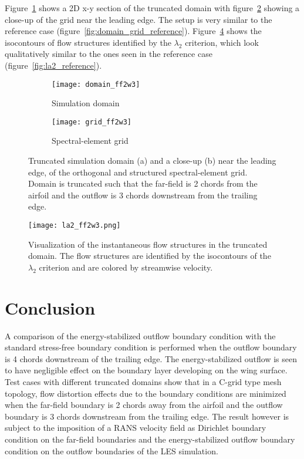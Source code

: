 Figure~\ref{fig:domain_ff2w3} shows a 2D x-y section of the truncated domain with figure~\ref{fig:grid_ff2w3} showing a close-up of the grid near the leading edge. The setup is very similar to the reference case (figure~\ref{fig:domain_grid_reference}). Figure~\ref{fig:la2_ff2w3} shows the isocontours of flow structures identified by the $\lambda_{2}$ criterion, which look qualitatively similar to the ones seen in the reference case (figure~\ref{fig:la2_reference}).
\begin{figure}[h]
	\centering
	\begin{subfigure}[b]{0.45\textwidth}
		\centering
		\texttt{[image: domain\_ff2w3]}
		\caption{Simulation domain}
		\label{fig:domain_ff2w3}
	\end{subfigure}
	\begin{subfigure}[b]{0.45\textwidth}
		\centering
		\texttt{[image: grid\_ff2w3]}
		\caption{Spectral-element grid}
		\label{fig:grid_ff2w3}
	\end{subfigure}
	\caption{Truncated simulation domain (a) and a close-up (b) near the leading edge, of the orthogonal and structured spectral-element grid. Domain is truncated such that the far-field is 2 chords from the airfoil and the outflow is 3 chords downstream from the trailing edge.}
	\label{fig:domain_grid_ff2w3}
\end{figure}

\begin{figure}
	\centering
	\texttt{[image: la2\_ff2w3.png]}
	\caption{Visualization of the instantaneous flow structures in the truncated domain. The flow structures are identified by the isocontours of the $\lambda_{2}$ criterion and are colored by streamwise velocity.}
	\label{fig:la2_ff2w3}
\end{figure}

\section{Conclusion}

A comparison of the energy-stabilized outflow boundary condition \citep{dong2014} with the standard stress-free boundary condition is performed when the outflow boundary is 4 chords downstream of the trailing edge. The energy-stabilized outflow is seen to have negligible effect on the boundary layer developing on the wing surface. Test cases with different truncated domains show that in a C-grid type mesh topology, flow distortion effects due to the boundary conditions are minimized when the far-field boundary is 2 chords away from the airfoil and the outflow boundary is 3 chords downstream from the trailing edge. The result however is subject to the imposition of a RANS velocity field as Dirichlet boundary condition on the far-field boundaries and the energy-stabilized outflow boundary condition on the outflow boundaries of the LES simulation.

%
%
%
